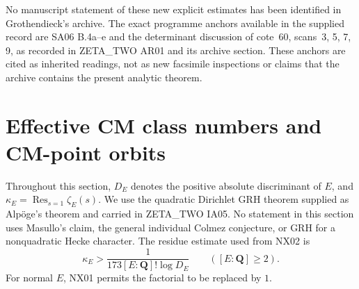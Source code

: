 \documentclass[11pt]{article}
\theoremstyle{remark}
\begin{document}
No manuscript statement of these new explicit estimates has been
identified in Grothendieck's archive. The exact programme anchors
available in the supplied record are SA06 B.4a--e and the determinant
discussion of cote~60, scans~3, 5, 7, 9, as recorded in ZETA\_TWO AR01
and its archive section. These anchors are cited as inherited readings,
not as new facsimile inspections or claims that the archive contains
the present analytic theorem.



\section{Effective CM class numbers and CM-point orbits}

Throughout this section, $D_E$ denotes the positive absolute discriminant of
$E$, and $\kappa_E=\operatorname*{Res}_{s=1}\zeta_E(s)$.
We use the quadratic Dirichlet GRH theorem supplied as Alp\"oge's theorem
and carried in ZETA\_TWO IA05.  No statement in this section uses Masullo's
claim, the general individual Colmez conjecture, or GRH for a nonquadratic
Hecke character.  The residue estimate used from NX02 is
\begin{equation}\label{eq:NC-residue-input}
 \kappa_E>\frac{1}{173[ E:\mathbf Q]!\log D_E}
 \qquad([E:\mathbf Q]\geq2).
\end{equation}
For normal $E$, NX01 permits the factorial to be replaced by $1$.
\end{document}
